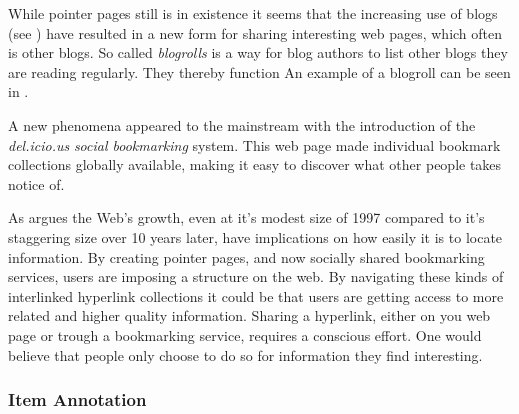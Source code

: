 While pointer pages still is in existence it seems that the increasing
use of blogs (see )
have resulted in a new form for sharing interesting web pages,
which often is other blogs. So called \emph{blogrolls} is a way for blog
authors to list other blogs they are reading regularly. They thereby function
An example of a blogroll can be seen in .

A new phenomena appeared to the mainstream with the introduction of the
\emph{del.icio.us}%
\emph{social bookmarking} system. This web page made individual
bookmark collections globally available, making it easy to discover what other
people takes notice of.




As \citet[p.~806]{dieberger97} argues the Web's growth, even at it's modest
size of 1997 compared to it's staggering size over 10 years later, have
implications on how easily it is to locate information. By creating pointer
pages, and now socially shared bookmarking services, users are imposing a
structure on the web. By navigating these kinds of interlinked hyperlink
collections it could be that users are getting access to more related and
higher quality information. Sharing a hyperlink, either on you web page or
trough a bookmarking service, requires a conscious effort. One would believe
that people only choose to do so for information they find interesting.

\subsubsection{Item Annotation}

